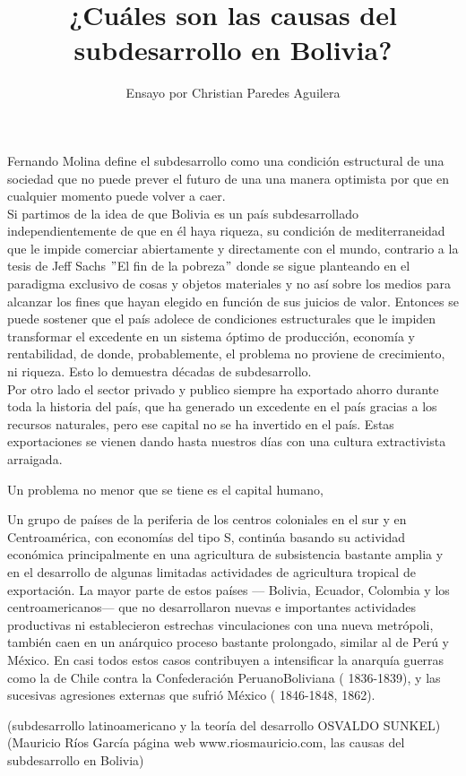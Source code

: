 \documentclass[10pt]{book}
\begin{document}
\normalfont

\author{Ensayo por Christian Paredes Aguilera}
\title{¿Cuáles son las causas del subdesarrollo en Bolivia?}
\date{}
\pagestyle{empty}
\maketitle
\thispagestyle{empty}
\let\cleardoublepage\clearpage


 
\let\cleardoublepage\clearpage


Fernando Molina define el subdesarrollo como una condición estructural de una sociedad que no puede prever el futuro de una una manera optimista por que en cualquier momento puede volver a caer. \\
Si partimos de la idea de que Bolivia es un país subdesarrollado independientemente de que en él haya riqueza, su condición de mediterraneidad que le impide comerciar abiertamente y directamente con el mundo, contrario a la tesis de Jeff Sachs $"$El fin de la pobreza$"$ donde se sigue planteando en el paradigma exclusivo de cosas y objetos materiales y no así  sobre los medios para alcanzar los fines que hayan elegido en función de sus juicios de valor. Entonces se puede sostener que el país adolece de condiciones estructurales que le impiden transformar el excedente en un sistema óptimo de producción, economía y rentabilidad, de donde, probablemente, el problema no proviene de crecimiento, ni riqueza. Esto lo demuestra décadas de subdesarrollo. \\
Por otro lado el sector privado y publico siempre ha exportado ahorro durante toda la historia del país, que ha generado un excedente en el país gracias a los recursos naturales, pero ese capital no se ha invertido en el país. Estas exportaciones se vienen dando hasta nuestros días con una cultura extractivista arraigada.

Un problema no menor que se tiene es el capital humano, 

Un grupo de países de la periferia de los centros coloniales en el sur y en Centroamérica, con economías del tipo S, continúa basando su actividad económica principalmente en una agricultura de subsistencia bastante amplia y en el desarrollo de algunas limitadas actividades de agricultura tropical de exportación. La mayor parte de estos países — Bolivia, Ecuador, Colombia y los centroamericanos— que no desarrollaron nuevas e importantes actividades productivas ni establecieron estrechas vinculaciones con una nueva metrópoli, también caen en un anárquico proceso bastante prolongado, similar al de Perú y México. En casi todos estos casos contribuyen a intensificar la anarquía guerras como la de Chile contra la Confederación PeruanoBoliviana ( 1836-1839), y las sucesivas agresiones externas que sufrió México
( 1846-1848, 1862). 

(subdesarrollo latinoamericano y la teoría del desarrollo OSVALDO SUNKEL)
(Mauricio Ríos García página web www.riosmauricio.com, las causas del subdesarrollo en Bolivia)
\end{document}
